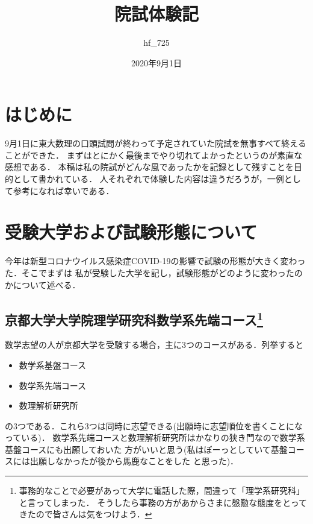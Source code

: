 \documentclass[dvipdfmx,uplatex]{jsarticle}
\title{院試体験記}
\author{hf\_725}
\date{2020年9月1日}
\begin{document}
\maketitle

\section{はじめに}

9月1日に東大数理の口頭試問が終わって予定されていた院試を無事すべて終えることができた．
まずはとにかく最後までやり切れてよかったというのが素直な感想である．
本稿は私の院試がどんな風であったかを記録として残すことを目的として書かれている．
人それぞれで体験した内容は違うだろうが，一例として参考になれば幸いである．

\section{受験大学および試験形態について}

今年は新型コロナウイルス感染症COVID-19の影響で試験の形態が大きく変わった．そこでまずは
私が受験した大学を記し，試験形態がどのように変わったのかについて述べる．

\subsection*{京都大学大学院理学研究科数学系先端コース\footnote{
事務的なことで必要があって大学に電話した際，間違って「理学系研究科」と言ってしまった．
そうしたら事務の方があからさまに慇懃な態度をとってきたので皆さんは気をつけよう．
}}

数学志望の人が京都大学を受験する場合，主に3つのコースがある．列挙すると
\begin{itemize}
    \item 数学系基盤コース
    \item 数学系先端コース
    \item 数理解析研究所
\end{itemize}
の3つである．これら3つは同時に志望できる(出願時に志望順位を書くことになっている)．
数学系先端コースと数理解析研究所はかなりの狭き門なので数学系基盤コースにも出願しておいた
方がいいと思う(私はぼーっとしていて基盤コースには出願しなかったが後から馬鹿なことをした
と思った)．
\end{document}
